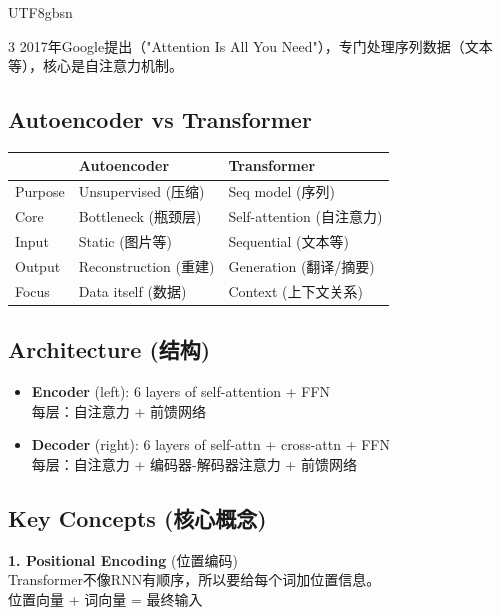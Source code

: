 \documentclass[9pt,landscape,a4paper]{article}
\newcommand{\zhint}[1]{{\scriptsize\color{gray!70!black}#1}}
\begin{document}
\begin{CJK}{UTF8}{gbsn}
\begin{multicols}{3}
\zhint{2017年Google提出（"Attention Is All You Need"），专门处理序列数据（文本等），核心是自注意力机制。}

\subsection{Autoencoder vs Transformer}
\begin{center}
\scriptsize
\begin{tabular}{lp{2.1cm}p{2.2cm}}
\toprule
 & \textbf{Autoencoder} & \textbf{Transformer} \\
\midrule
Purpose & Unsupervised \zhint{(压缩)} & Seq model \zhint{(序列)} \\
Core & Bottleneck \zhint{(瓶颈层)} & Self-attention \zhint{(自注意力)} \\
Input & Static \zhint{(图片等)} & Sequential \zhint{(文本等)} \\
Output & Reconstruction \zhint{(重建)} & Generation \zhint{(翻译/摘要)} \\
Focus & Data itself \zhint{(数据)} & Context \zhint{(上下文关系)} \\
\bottomrule
\end{tabular}
\end{center}

\subsection{Architecture \zhint{(结构)}}
\begin{itemize}[leftmargin=*, nosep, itemsep=0pt]
    \item \textbf{Encoder} (left): 6 layers of self-attention + FFN\\
    \zhint{每层：自注意力 + 前馈网络}
    \item \textbf{Decoder} (right): 6 layers of self-attn + cross-attn + FFN\\
    \zhint{每层：自注意力 + 编码器-解码器注意力 + 前馈网络}
\end{itemize}

\subsection{Key Concepts \zhint{(核心概念)}}

\textbf{1. Positional Encoding} \zhint{(位置编码)}\\
\zhint{Transformer不像RNN有顺序，所以要给每个词加位置信息。}\\
\zhint{位置向量 + 词向量 = 最终输入}


\end{multicols}
\end{CJK}
\end{document}
